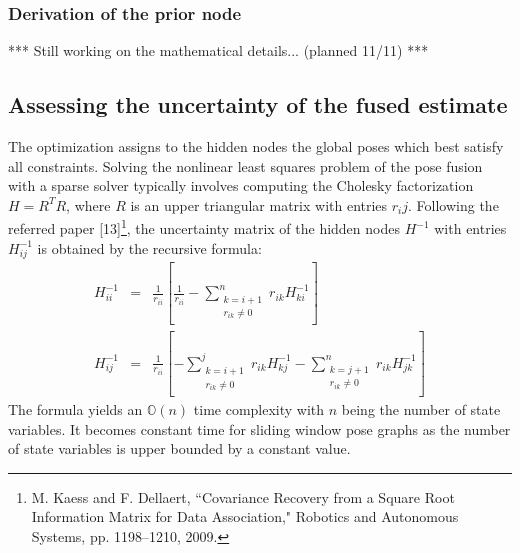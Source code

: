 \documentclass[letterpaper,11pt]{article}
\begin{document}
\subsubsection{Derivation of the prior node}
***
Still working on the mathematical details... (planned 11/11)
***

\subsection{Assessing the uncertainty of the fused estimate}

The optimization assigns to the hidden nodes the global poses which best satisfy all constraints. Solving the nonlinear least squares problem of the pose fusion with a sparse solver typically involves computing the Cholesky factorization $H=R^TR$, where $R$ is an upper triangular matrix with entries $r_ij$. Following the referred paper [13]\footnote{M. Kaess and F. Dellaert, ``Covariance Recovery from a Square Root Information Matrix for Data Association," Robotics and Autonomous Systems, pp. 1198–1210, 2009.}, the uncertainty matrix of the hidden nodes $H^{-1}$ with entries $H_{ij}^{-1}$ is obtained by the recursive formula:
\begin{equation}
\begin{array}{rcl}
H_{ii}^{-1} & = & \frac{1}{r_{ii}}\left[\frac{1}{r_{ii}}-\sum_{\begin{array}{c}
	k=i+1 \\
	r_{ik} \neq 0 \\
	\end{array}}^{n}{r_{ik}H_{ki}^{-1}}\right] \\
H_{ij}^{-1} & = & \frac{1}{r_{ii}}\left[-\sum_{\begin{array}{c}
	k=i+1 \\
	r_{ik} \neq 0 \\
	\end{array}}^{j}{r_{ik}H_{kj}^{-1}}-\sum_{\begin{array}{c}
	k=j+1 \\
	r_{ik} \neq 0 \\
	\end{array}}^{n}{r_{ik}H_{jk}^{-1}}\right]
\end{array}
\end{equation}
The formula yields an $\mathbb{O}(n)$ time complexity with $n$ being the number of state variables. It becomes constant time for sliding window pose graphs as the number of state variables is upper bounded by a constant value.
\end{document}
